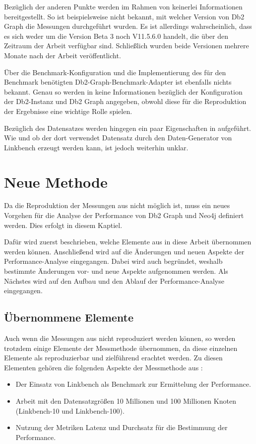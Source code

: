 Bezüglich der anderen Punkte werden im Rahmen von \cite{sigmod_tian} keinerlei Informationen bereitgestellt. So ist beispielsweise nicht bekannt, mit welcher Version von Db2 Graph die Messungen durchgeführt wurden. Es ist allerdings wahrscheinlich, dass es sich weder um die Version Beta 3 noch V11.5.6.0 handelt, die über den Zeitraum der Arbeit verfügbar sind. Schließlich wurden beide Versionen mehrere Monate nach der Arbeit veröffentlicht. 

Über die Benchmark-Konfiguration und die Implementierung des für den Benchmark benötigten Db2-Graph-Benchmark-Adapter ist ebenfalls nichts bekannt. Genau so werden in \cite{sigmod_tian} keine Informationen bezüglich der Konfiguration der Db2-Instanz und Db2 Graph angegeben, obwohl diese für die Reproduktion der Ergebnisse eine wichtige Rolle spielen. 

Bezüglich des Datensatzes werden hingegen ein paar Eigenschaften in \cite{sigmod_tian} aufgeführt. Wie und ob der dort verwendet Datensatz durch den Daten-Generator von Linkbench erzeugt werden kann, ist jedoch weiterhin unklar.

\section{Neue Methode}
Da die Reproduktion der Messungen aus \cite{sigmod_tian} nicht möglich ist, muss ein neues Vorgehen für die Analyse der Performance von Db2 Graph und Neo4j definiert werden. Dies erfolgt in diesem Kaptiel. 

Dafür wird zuerst beschrieben, welche Elemente aus \cite{sigmod_tian} in diese Arbeit übernommen werden können. Anschließend wird auf die Änderungen und neuen Aspekte der Performance-Analyse eingegangen. Dabei wird auch begründet, weshalb bestimmte Änderungen vor- und neue Aspekte aufgenommen werden. Als Nächstes wird auf den Aufbau und den Ablauf der Performance-Analyse eingegangen. 

\subsection{Übernommene Elemente}
Auch wenn die Messungen aus \cite{sigmod_tian} nicht reproduziert werden können, so werden trotzdem einige Elemente der Messmethode übernommen, da diese einzelnen Elemente als reproduzierbar und zielführend erachtet werden. Zu diesen Elementen gehören die folgenden Aspekte der Messmethode aus \cite{sigmod_tian}:
\begin{itemize}
    \item Der Einsatz von Linkbench als Benchmark zur Ermittelung der Performance.
    \item Arbeit mit den Datensatzgrößen 10 Millionen und 100 Millionen Knoten (Linkbench-10 und Linkbench-100).
    \item Nutzung der Metriken Latenz und Durchsatz für die Bestimmung der Performance.  
\end{itemize}

